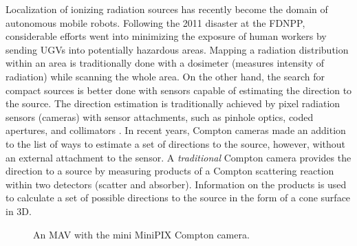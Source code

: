 \documentclass[a4paper,11pt,titlepage,twoside]{book}
\begin{document}
Localization of ionizing radiation sources has recently become the domain of autonomous mobile robots.
Following the 2011 disaster at the \ac{FDNPP}, considerable efforts went into minimizing the exposure of human workers by sending \acp{UGV} into potentially hazardous areas.
Mapping a radiation distribution within an area is traditionally done with a dosimeter (measures intensity of radiation) while scanning the whole area.
On the other hand, the search for compact sources is better done with sensors capable of estimating the direction to the source.
The direction estimation is traditionally achieved by pixel radiation sensors (cameras) with sensor attachments, such as pinhole optics, coded apertures, and collimators \cite{baca2019timepix}.
In recent years, Compton cameras made an addition to the list of ways to estimate a set of directions to the source, however, without an external attachment to the sensor.
A \emph{traditional} Compton camera provides the direction to a source by measuring products of a Compton scattering reaction within two detectors (scatter and absorber).
Information on the products is used to calculate a set of possible directions to the source in the form of a cone surface in 3D.


\begin{figure}
  \centering
  \hfill%
  \caption{An \ac{MAV} with the mini MiniPIX Compton camera.}
  \label{fig:timepix}
\end{figure}
\end{document}
